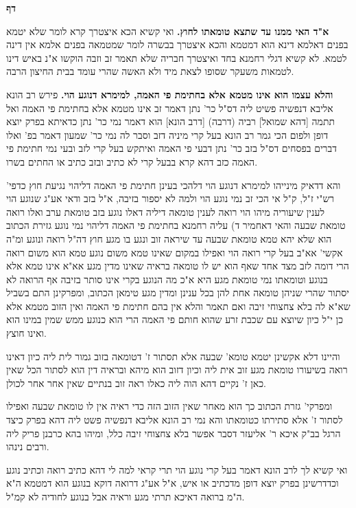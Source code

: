 \documentclass[12pt, openany]{book}
\newcommand{\sethebfont}{
\fontsize{10.5pt}{21.0pt} \selectfont
}
\newcommand{\twocol}[1]{
	{\sethebfont \begin{multicols}{2}
			#1
	\end{multicols}}	
}
\newcommand{\chapname}{}
\newcommand{\newchap}[1]{
	\addcontentsline{toc}{chapter}{#1}
	\renewcommand{\chapname}{#1}
		\begin{center}
			\textbf{%
\fontsize{16pt}{16pt}\selectfont
				#1}
		\end{center}
}
\begin{document}
{\par}
\newchap{דף }
\twocol{\textbf{א"ד האי ממנו עד שתצא טומאתו לחוץ.}  ואי קשיא הכא איצטרך קרא לומר שלא יטמא בפנים דאלמא דינא הוא דמטמא והכא איצטרך בבשרה לומר שמטמאה בפנים אלמא אין דינה לטמא. לא קשיא דגלי רחמנא בחד ואיצטרך חבריה שלא תאמר זב וזבה הוקשו א"נ באיש דינו לטמאות משעקר שסופו לצאת מיד ולא האשה שהרי עומד בבית החיצון הרבה. 
\par\textbf{והלא עצמו הוא אינו מטמא אלא בחתימת פי האמה, למימרא דנוגע הוי.}  פירש רב הונא אליבא דנפשיה פשיט ליה דס"ל כר' נתן דאמר זב אינו מטמא אלא בחתימת פי האמה ואל תתמה [דהא שמואל] רביה (דרבה) [דרב הונא] הוא דאמר נמי כר' נתן כדאיתא בפרק יוצא דופן ולפום הכי גמר רב הונא בעל קרי מיניה דזב וסבר לה נמי כר' שמעון דאמר בפ' ואלו דברים בפסחים דס"ל בזב כר' נתן דבעי פי האמה ואיתקש בעל קרי לזב ובעי נמי חתימת פי האמה כזב דהא קרא בבעל קרי לא כתיב ובזב כתיב או החתים בשרו.\par  והא דדאיק מינייהו למימרא דנוגע הוי דלהכי בעינן חתימת פי האמה דליהוי נגיעת חוץ כדפי' רש"י ז"ל, ק"ל אי הכי זב נמי נוגע הוי ולמה לא יספור בזיבה, א"ל בזב ודאי אע"ג שנוגע הוי לענין שיעוריה מיהו הוי רואה לענין טומאה דיליה דאלו נוגע בזב טומאת ערב ואלו רואה טומאת שבעה והאי דאחמיר ד) עליה רחמנא בחתימת פי האמה דליהוי נמי נוגע גזירת הכתוב הוא שלא יהא טמא טומאת שבעה עד שיראה זוב ונגע בו מגע חוץ דה"ל רואה ונוגע ומ"ה אקשי' אא"ב בעל קרי רואה הוי ואפילו במקום שאינו טמא משום נוגע טמא הוא משום רואה הרי דומה לזב מצד אחד שאף הוא יש לו טומאה בראיה שאינו מדין מגע אא"א אינו טמא אלא בנוגע וטומאתו נמי טומאת מגע היא א"כ מה הנוגע בקרי אינו סותר בזיבה אף הרואה לא יסתור שהרי שניהן טומאה אחת להן בכל ענינן ומדין מגע טימאן הכתוב, ומפרקינן התם בשביל שא"א לה בלא צחצוחי זיבה ואם תאמר והלא אין בהם חתימת פי האמה ואין הזוב מטמא אלא כן י"ל כיון שיוצא עם שכבת זרע שהוא חותם פי האמה הרי הוא כנוגע ממש שמין במינו הוא ואינו חוצץ.\par  והיינו דלא אקשינן יטמא טומא' שבעה אלא תסתור ז' דטומאה בזוב גמור לית ליה כיון דאינו רואה בשיעורו טומאת מגע זוב אית ליה וכיון דזוב הוא מיהא ובראיה דין הוא לסתור הכל שאין כאן ז' נקיים דהא הוה ליה כאלו ראה זוב בנתיים שאין אחר אחר לכולן.\par  ומפרקי' גזרת הכתוב כך הוא מאחר שאין הזוב הזה כדי ראיה אין לו טומאת שבעה ואפילו לסתור ז' אלא סתירתו כטומאתו והא נמי רב הונא אליבא דנפשיה פשט ליה דהא בפרק כיצד הרגל בב"ק איכא ר' אליעזר דסבר אפשר בלא צחצוחי זיבה כלל, ומיהו בהא כרבנן פריק ליה ורבים נינהו.\par  ואי קשיא לך לרב הונא דאמר בעל קרי נוגע הוי תרי קראי למה לי דהא כתיב רואה וכתיב נוגע וכדדרשינן בפרק יוצא דופן מדכתיב או איש, א"ל אע"ג דרואה דוקא בנוגע הוא דמטמא ה"א ה"מ ברואה דאיכא תרתי מגע וראיה אבל בנוגע לחודיה לא קמ"ל. 
\par}
\end{document}
